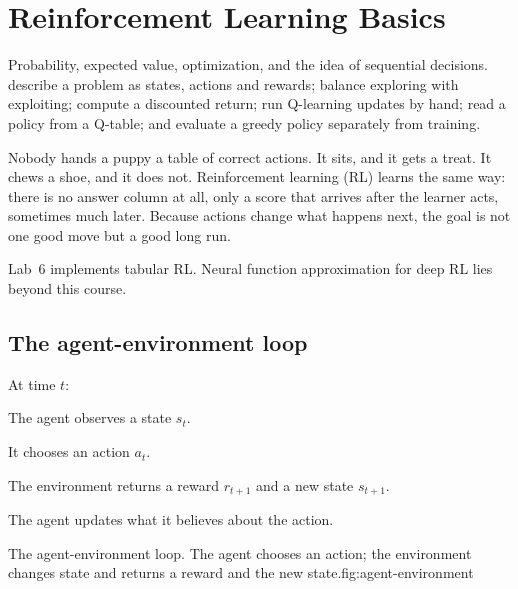 \chapter{Reinforcement Learning Basics}
\label{ch:rl}

\chapterguide%
  {Probability, expected value, optimization, and the idea of sequential decisions.}
  {describe a problem as states, actions and rewards; balance exploring with exploiting; compute a discounted return; run Q-learning updates by hand; read a policy from a Q-table; and evaluate a greedy policy separately from training.}

Nobody hands a puppy a table of correct actions. It sits, and it gets a treat. It chews a shoe, and it does not. Reinforcement learning (RL) learns the same way: there is no answer column at all, only a score that arrives after the learner acts, sometimes much later. Because actions change what happens next, the goal is not one good move but a good long run.

\begin{coursechoice}
Lab~6 implements tabular RL. Neural function approximation for deep RL lies beyond this course.
\end{coursechoice}

\section{The agent-environment loop}

At time $t$:

\begin{utpsteps}
  \item The agent observes a state $s_t$.
  \item It chooses an action $a_t$.
  \item The environment returns a reward $r_{t+1}$ and a new state $s_{t+1}$.
  \item The agent updates what it believes about the action.
\end{utpsteps}

\begin{utpfig}{The agent-environment loop. The agent chooses an action; the environment changes state and returns a reward and the new state.}{fig:agent-environment}
\end{utpfig}

